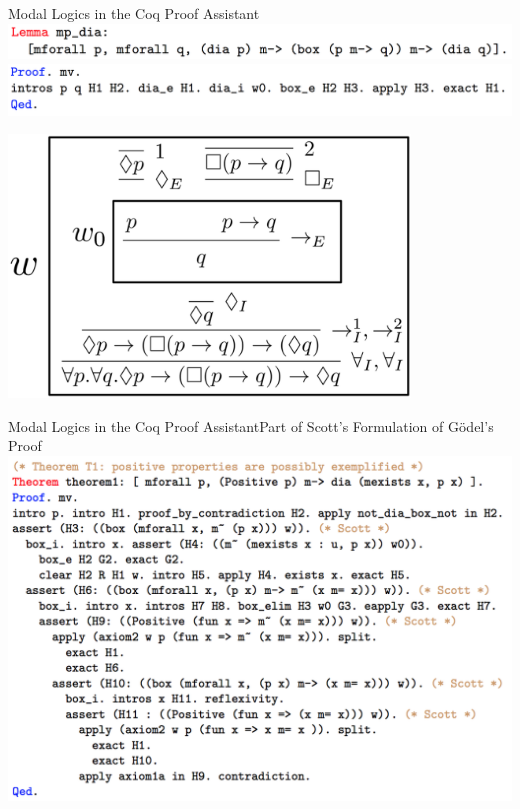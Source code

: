 \begin{frame}{Modal Logics in the Coq Proof Assistant}
\includegraphics[width=\textwidth]{Images/CoqCode/10.png}\\
\includegraphics[width=\textwidth]{Images/CoqCode/13.png}

\bigskip

\begin{center}
\includegraphics[width=0.8\textwidth]{Images/CoqCode/MP_Dia.png}
\end{center}

\end{frame}


\begin{frame}{Modal Logics in the Coq Proof Assistant}{Part of Scott's Formulation of G\"odel's Proof}
\includegraphics[width=\textwidth]{Images/CoqCode/14.png}
\end{frame}




